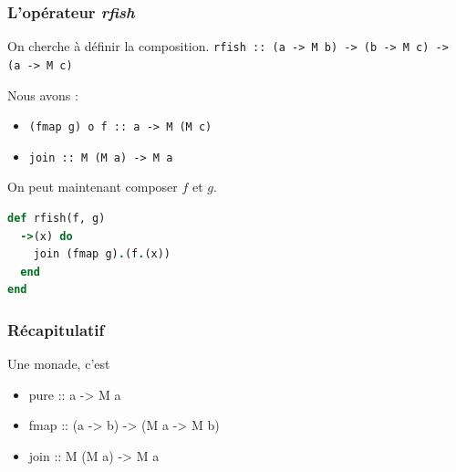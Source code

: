 \documentclass{beamer}
\begin{document}
\begin{frame}[fragile]
\frametitle{L'opérateur \emph{rfish}}
\begin{block}{On cherche à définir la composition.}
\verb!rfish :: (a -> M b) -> (b -> M c) -> (a -> M c)!
\end{block}

\pause

\begin{block}{Nous avons :}
\begin{itemize}
\item \verb!(fmap g) o f :: a -> M (M c)!
\item \verb!join :: M (M a) -> M a!
\end{itemize}
\end{block}
\pause

\begin{block}{On peut maintenant composer $f$ et $g$.}
\begin{lstlisting}[language=ruby]
def rfish(f, g)
  ->(x) do
    join (fmap g).(f.(x))
  end
end
\end{lstlisting}
\end{block}
\end{frame}

\begin{frame}
\frametitle{Récapitulatif}

\begin{block}{Une monade, c'est}

	\begin{itemize}
		\item pure :: a -> M a
		\item fmap :: (a -> b) -> (M a -> M b)
		\item join :: M (M a) -> M a
	\end{itemize}

\end{block}

\end{frame}
\end{document}
